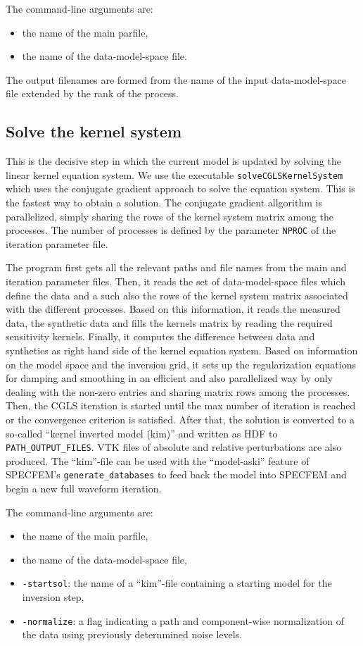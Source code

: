  The command-line arguments are:
 \begin{itemize}
	\setlength{\itemsep}{-0.1cm}
   \item the name of the main parfile,
   \item the name of the data-model-space file.
 \end{itemize}
 The output filenames are formed from the name of the input data-model-space file extended by the rank of the process.
%
\subsection{Solve the kernel system}
\label{sec:solve-kernel-system}
%
 This is the decisive step in which the current model is updated by solving the linear kernel equation system. We use the executable \verb+solveCGLSKernelSystem+ which uses the conjugate gradient approach to solve the equation system. This is the fastest way to obtain a solution.
 The conjugate gradient allgorithm is parallelized, simply sharing the rows of the kernel system matrix among the processes. The number of processes is defined by the parameter \verb+NPROC+ of the iteration parameter file.

 The program first gets all the relevant paths and file names from the main and iteration parameter files. Then, it reads the set of data-model-space  files which define the data and a such also the rows of the kernel system matrix associated with the different processes. Based on this information, it reads the measured data, the synthetic data and fills the kernels matrix by reading the required sensitivity kernels. Finally, it computes the difference between data and synthetics as right hand side of the kernel equation system. Based on information on the model space and the inversion grid, it sets up the regularization equations for damping and smoothing in an efficient and also parallelized way by only dealing with the non-zero entries and sharing matrix rows among the processes. Then, the CGLS iteration is started until the max number of iteration is reached or the convergence criterion is satisfied. After that, the solution is converted to a so-called ``kernel inverted model (kim)'' and written as HDF to \verb+PATH_OUTPUT_FILES+. VTK files of absolute and relative perturbations are also produced. The ``kim''-file can be used with the ``model-aski'' feature of SPECFEM's \verb+generate_databases+ to feed back the model into SPECFEM and begin a new full waveform iteration.

 The command-line arguments are:
 \begin{itemize}
	\setlength{\itemsep}{-0.1cm}
   \item the name of the main parfile,
   \item the name of the data-model-space file,
   \item \verb+-startsol+: the name of a ``kim''-file containing a starting model for the inversion step,
   \item \verb+-normalize+: a flag indicating a path and component-wise normalization of the data using previously deternmined noise levels.
 \end{itemize}
